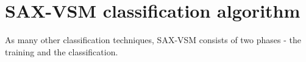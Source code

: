 \documentclass[conference]{IEEEtran}
\begin{document}

\section{SAX-VSM classification algorithm} \label{sax-vsm}
As many other classification techniques, SAX-VSM consists of two phases - 
the training and the classification. 

\end{document}
